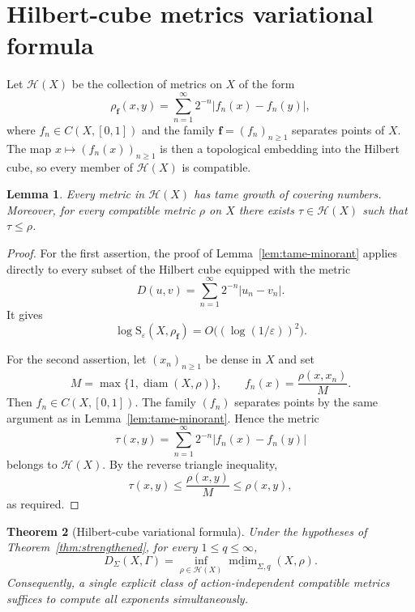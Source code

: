 \documentclass[12pt]{amsart}
\newtheorem{theorem}{Theorem}[section]
\newtheorem{lemma}[theorem]{Lemma}
\theoremstyle{definition}
\theoremstyle{remark}
\newcommand{\mdim}{\operatorname{mdim}}
\newcommand{\diam}{\operatorname{diam}}
\begin{document}
\section{Hilbert-cube metrics variational formula}
\label{sec:hilbert}

Let $\mathcal H(X)$ be the collection of metrics on $X$ of the form
\[
 \rho_{\mathbf f}(x,y)
 =\sum_{n=1}^{\infty}2^{-n}|f_n(x)-f_n(y)|,
 \tag{5.1}
\]
where $f_n\in C(X,[0,1])$ and the family $\mathbf{f}=(f_n)_{n\geq1}$ separates
points of $X$. The map
$x\mapsto(f_n(x))_{n\geq1}$ is then a topological embedding into the
Hilbert cube, so every member of $\mathcal H(X)$ is compatible.

\begin{lemma}
\label{lem:hilbert-cofinal}
Every metric in $\mathcal H(X)$ has tame growth of covering numbers.
Moreover, for every compatible metric $\rho$ on $X$ there exists
$\tau\in\mathcal H(X)$ such that $\tau\leq\rho$.
\end{lemma}

\begin{proof}
For the first assertion, the proof of Lemma~\ref{lem:tame-minorant}
applies directly to every subset of the Hilbert cube equipped with the
metric
\[
 D(u,v)=\sum_{n=1}^{\infty}2^{-n}|u_n-v_n|.
\]
It gives
\[
 \log \mathrm{S}_\varepsilon(X,\rho_{\mathbf f})
 =O\bigl((\log(1/\varepsilon))^2\bigr).
\]

For the second assertion, let $(x_n)_{n\geq1}$ be dense in $X$ and set
\[
 M=\max\{1,\diam(X,\rho)\},
 \qquad f_n(x)=\frac{\rho(x,x_n)}{M}.
\]
Then $f_n\in C(X,[0,1])$. The family $(f_n)$ separates points by the
same argument as in Lemma~\ref{lem:tame-minorant}. Hence the metric
\[
 \tau(x,y)=\sum_{n=1}^{\infty}2^{-n}|f_n(x)-f_n(y)|
\]
belongs to $\mathcal H(X)$. By the reverse triangle inequality,
\[
 \tau(x,y)\leq\frac{\rho(x,y)}{M}\leq\rho(x,y),
\]
as required.
\end{proof}

\begin{theorem}[Hilbert-cube variational formula]
\label{thm:hilbert-formula}
Under the hypotheses of Theorem~\ref{thm:strengthened}, for every
$1\leq q\leq\infty$,
\[
 D_\Sigma(X,\Gamma)
 =\inf_{\rho\in\mathcal H(X)}
 \underline{\mdim}_{\Sigma,q}(X,\rho).
 \tag{5.2}
\]
Consequently, a single explicit class of action-independent compatible metrics suffices to compute all exponents simultaneously.
\end{theorem}
\end{document}
